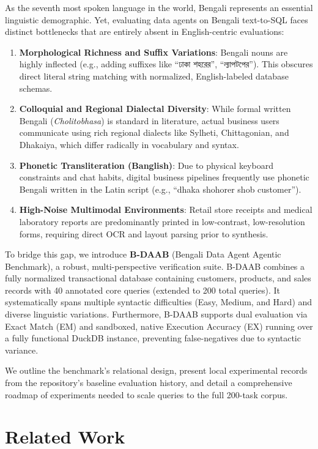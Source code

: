 \documentclass[11pt,a4paper]{article}
\begin{document}
As the seventh most spoken language in the world, Bengali represents an essential linguistic demographic. Yet, evaluating data agents on Bengali text-to-SQL faces distinct bottlenecks that are entirely absent in English-centric evaluations:
\begin{enumerate}
    \item \textbf{Morphological Richness and Suffix Variations}: Bengali nouns are highly inflected (e.g., adding suffixes like ``ঢাকা শহরের'', ``ল্যাপটপের''). This obscures direct literal string matching with normalized, English-labeled database schemas.
    \item \textbf{Colloquial and Regional Dialectal Diversity}: While formal written Bengali (\textit{Cholitobhasa}) is standard in literature, actual business users communicate using rich regional dialects like Sylheti, Chittagonian, and Dhakaiya, which differ radically in vocabulary and syntax.
    \item \textbf{Phonetic Transliteration (Banglish)}: Due to physical keyboard constraints and chat habits, digital business pipelines frequently use phonetic Bengali written in the Latin script (e.g., ``dhaka shohorer shob customer'').
    \item \textbf{High-Noise Multimodal Environments}: Retail store receipts and medical laboratory reports are predominantly printed in low-contrast, low-resolution forms, requiring direct OCR and layout parsing prior to synthesis.
\end{enumerate}

To bridge this gap, we introduce \textbf{B-DAAB} (Bengali Data Agent Agentic Benchmark), a robust, multi-perspective verification suite. B-DAAB combines a fully normalized transactional database containing customers, products, and sales records with 40 annotated core queries (extended to 200 total queries). It systematically spans multiple syntactic difficulties (Easy, Medium, and Hard) and diverse linguistic variations. Furthermore, B-DAAB supports dual evaluation via Exact Match (EM) and sandboxed, native Execution Accuracy (EX) running over a fully functional DuckDB instance, preventing false-negatives due to syntactic variance.

We outline the benchmark's relational design, present local experimental records from the repository's baseline evaluation history, and detail a comprehensive roadmap of experiments needed to scale queries to the full 200-task corpus.

\section{Related Work}
\end{document}
